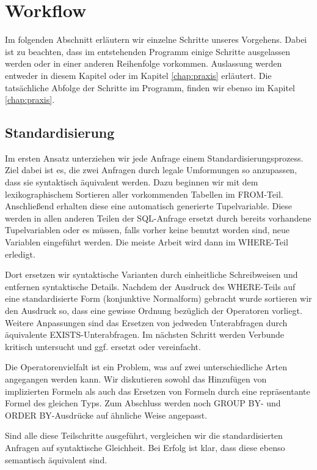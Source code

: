 \section{Workflow}

Im folgenden Abschnitt erläutern wir einzelne Schritte unseres Vorgehens. Dabei ist zu beachten, dass im entstehenden Programm einige Schritte ausgelassen werden oder in einer anderen Reihenfolge vorkommen. Auslassung werden entweder in diesem Kapitel oder im Kapitel \ref{chap:praxis} erläutert. Die tatsächliche Abfolge der Schritte im Programm, finden wir ebenso im Kapitel \ref{chap:praxis}.

\subsection{Standardisierung}

Im ersten Ansatz unterziehen wir jede Anfrage einem Standardisierungsprozess. Ziel dabei ist es, die zwei Anfragen durch legale Umformungen so anzupassen, dass sie syntaktisch äquivalent werden. Dazu beginnen wir mit dem lexikographischem Sortieren aller vorkommenden Tabellen im FROM-Teil. Anschließend erhalten diese eine automatisch generierte Tupelvariable. Diese werden in allen anderen Teilen der SQL-Anfrage ersetzt durch bereits vorhandene Tupelvariablen oder es müssen, falls vorher keine benutzt worden sind, neue Variablen eingeführt werden. Die meiste Arbeit wird dann im WHERE-Teil erledigt. 

Dort ersetzen wir syntaktische Varianten durch einheitliche Schreibweisen und entfernen syntaktische Details. Nachdem der Ausdruck des WHERE-Teils auf eine standardisierte Form (konjunktive Normalform) gebracht wurde sortieren wir den Ausdruck so, dass eine gewisse Ordnung bezüglich der Operatoren vorliegt. Weitere Anpassungen sind das Ersetzen von jedweden Unterabfragen durch äquivalente EXISTS-Unterabfragen. Im nächsten Schritt werden Verbunde kritisch untersucht und ggf. ersetzt oder vereinfacht. 

Die Operatorenvielfalt ist ein Problem, was auf zwei unterschiedliche Arten angegangen werden kann. Wir diskutieren sowohl das Hinzufügen von implizierten Formeln als auch das Ersetzen von Formeln durch eine repräsentante Formel des gleichen Typs. Zum Abschluss werden noch GROUP BY- und ORDER BY-Ausdrücke auf ähnliche Weise angepasst.

Sind alle diese Teilschritte ausgeführt, vergleichen wir die standardisierten Anfragen auf syntaktische Gleichheit. Bei Erfolg ist klar, dass diese ebenso semantisch äquivalent sind.

